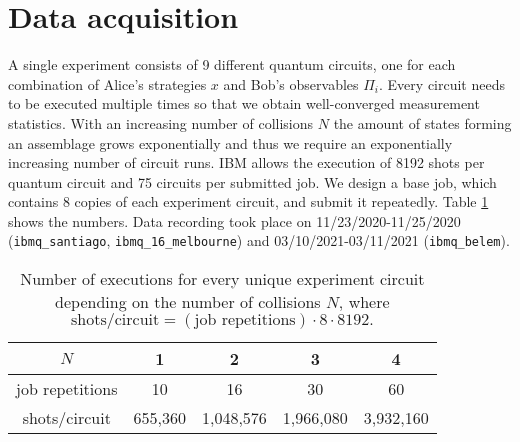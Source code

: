 \documentclass[aps,pra,twocolumn,superscriptaddress,showemail,showpacs,longbibliography]{revtex4-2}
\begin{document}
\section{Data acquisition}
\label{app:data}
A single experiment consists of 9 different quantum circuits, one for each combination of Alice's strategies $x$ and Bob's observables $\Pi_i$. Every circuit needs to be executed multiple times so that we obtain well-converged measurement statistics. With an increasing number of collisions $N$ the amount of states forming an assemblage grows exponentially and thus we require an exponentially increasing number of circuit runs. IBM allows the execution of 8192 shots per quantum circuit and 75 circuits per submitted job. We design a base job, which contains 8 copies of each experiment circuit, and submit it repeatedly. Table \ref{tab:shots} shows the numbers. Data recording took place on 11/23/2020-11/25/2020 (\texttt{ibmq\_santiago}, \texttt{ibmq\_16\_melbourne}) and 03/10/2021-03/11/2021 (\texttt{ibmq\_belem}).
\begin{table}[ht]
    \centering
    \begin{tabular}{c|cccc}
        $N$ & 1 & 2 & 3 & 4 \\
        \hline
        job repetitions & 10 & 16 & 30 & 60 \\
        shots/circuit & 655,360 & 1,048,576 & 1,966,080 & 3,932,160
    \end{tabular}
    \caption{Number of executions for every unique experiment circuit depending on the number of collisions $N$, where $\text{shots/circuit} = (\text{job repetitions}) \cdot 8 \cdot 8192.$}
    \label{tab:shots}
\end{table}



\end{document}
